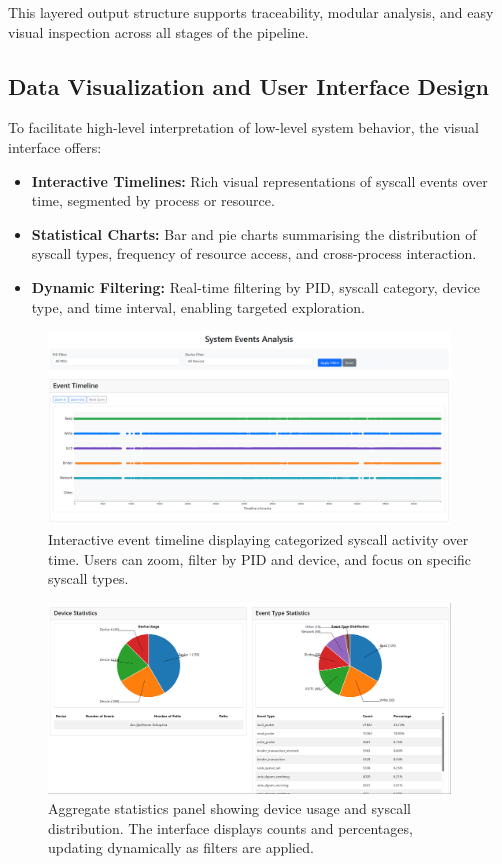 \documentclass[a4paper,12pt]{report}
\begin{document}
This layered output structure supports traceability, modular analysis, and easy visual inspection across all stages of the pipeline.



\subsection{Data Visualization and User Interface Design}

To facilitate high-level interpretation of low-level system behavior, the visual interface offers:

\begin{itemize}
  \item \textbf{Interactive Timelines:} Rich visual representations of syscall events over time, segmented by process or resource.
  \item \textbf{Statistical Charts:} Bar and pie charts summarising the distribution of syscall types, frequency of resource access, and cross-process interaction.
  \item \textbf{Dynamic Filtering:} Real-time filtering by PID, syscall category, device type, and time interval, enabling targeted exploration.
\end{itemize}

\begin{figure}[H]
\centering
\includegraphics[width=0.95\textwidth]{system_events_timeline.png}
\caption{Interactive event timeline displaying categorized syscall activity over time. Users can zoom, filter by PID and device, and focus on specific syscall types.}
\label{fig:event_timeline}
\end{figure}

\begin{figure}[H]
\centering
\includegraphics[width=0.95\textwidth]{device_event_statistics.png}
\caption{Aggregate statistics panel showing device usage and syscall distribution. The interface displays counts and percentages, updating dynamically as filters are applied.}
\label{fig:statistics_view}
\end{figure}
\end{document}
